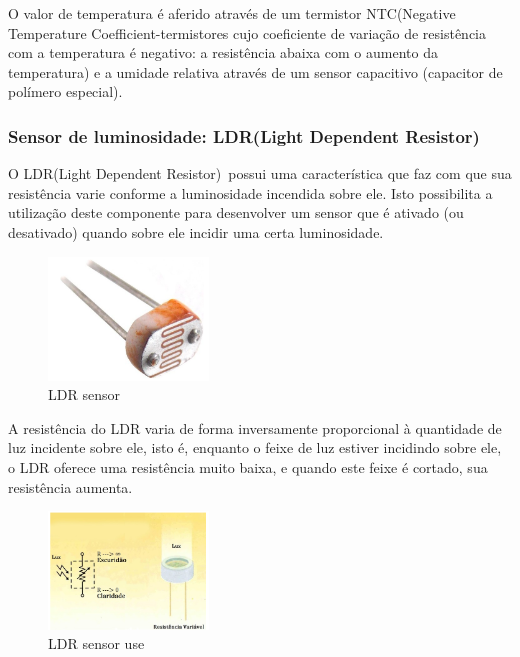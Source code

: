 O valor de temperatura é aferido através de um termistor NTC(Negative Temperature Coefficient-termistores cujo coeficiente de variação de resistência com a temperatura é negativo: a resistência abaixa com o aumento da temperatura) e a umidade relativa através de um sensor capacitivo (capacitor de polímero especial)\cite{robotics2010dht11}. 


\subsubsection{Sensor de luminosidade: LDR(Light Dependent Resistor)}


O LDR(Light Dependent Resistor) possui uma característica que faz com que sua resistência varie conforme a luminosidade incendida sobre ele. Isto possibilita a utilização deste componente para desenvolver um sensor que é ativado (ou desativado) quando sobre ele incidir uma certa luminosidade.

\begin{figure}[!tb]
\centering
\includegraphics[width=0.38\textwidth]{figs/ldr}
\caption{LDR sensor}
\label{fig-ldr}
\end{figure}


A resistência do LDR varia de forma inversamente proporcional à quantidade de luz incidente sobre ele, isto é, enquanto o feixe de luz estiver incidindo sobre ele, o LDR oferece uma resistência muito baixa, e quando este feixe é cortado, sua resistência aumenta\cite{ldr2010manual}.

\begin{figure}[!tb]
\centering
\includegraphics[width=0.38\textwidth]{figs/ldr-1}
\caption{LDR sensor use}
\label{fig-ldr-1}
\end{figure}


